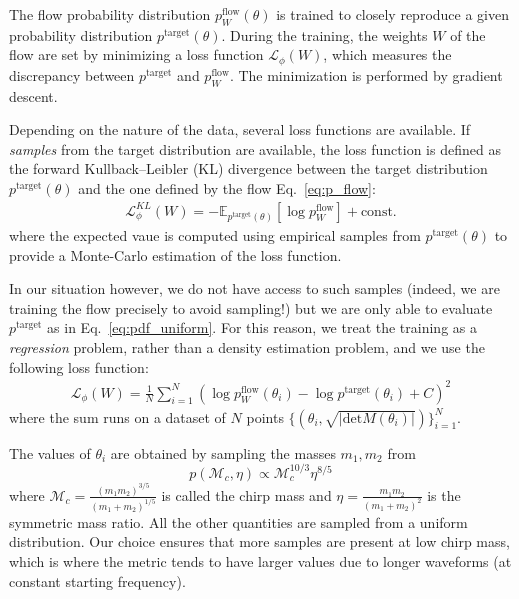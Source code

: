 \documentclass[twocolumn,showpacs,preprintnumbers,nofootinbib,prd,
superscriptaddress,10pt]{revtex4-2}
\begin{document}
The flow probability distribution $p^\text{flow}_W(\theta)$ is trained to closely reproduce a given probability distribution $p^\text{target}(\theta)$.
During the training, the weights $W$ of the flow are set by minimizing a loss function $\mathcal{L}_\phi(W)$, which measures the discrepancy between $p^\text{target}$ and $p^\text{flow}_W$. The minimization is performed by gradient descent.

Depending on the nature of the data, several loss functions are available.
If {\it samples} from the target distribution are available, the loss function is defined as the forward Kullback–Leibler (KL) divergence between the target distribution $p^\text{target}(\theta)$ and the one defined by the flow Eq.~\eqref{eq:p_flow}:
\begin{align}
	\mathcal{L}^{KL}_\phi(W) = - \mathbb{E}_{p^\text{target}(\theta)} [\log p^\text{flow}_W] + \text{const.}
\end{align}
where the expected vaue is computed using empirical samples from $p^\text{target}(\theta)$ to provide a Monte-Carlo estimation of the loss function.

In our situation however, we do not have access to such samples (indeed, we are training the flow precisely to avoid sampling!) but we are only able to evaluate $p^\text{target}$ as in Eq.~\eqref{eq:pdf_uniform}.
For this reason, we treat the training as a {\it regression} problem, rather than a density estimation problem, and we use the following loss function:
%
\begin{align}
	\mathcal{L}_\phi(W) = \frac{1}{N} \sum_{i=1}^N \left(\log p^\text{flow}_W(\theta_i) - \log p^\text{target}(\theta_i) + C \right)^2
\end{align}
%
where the sum runs on a dataset of $N$ points $\{(\theta_i, \sqrt{|\text{det}M(\theta_i)|})\}_{i=1}^N$.

The values of $\theta_i$ are obtained by sampling the masses $m_1, m_2$ from
\begin{equation}
	p(\mathcal{M}_c, \eta) \propto \mathcal{M}_c^{10/3} \eta^{8/5}
\end{equation}
where $\mathcal{M}_c = \frac{(m_1m_2)^{3/5}}{(m_1+m_2)^{1/5}}$ is called the chirp mass and $\eta = \frac{m_1m_2}{(m_1+m_2)^2}$ is the symmetric mass ratio.
All the other quantities are sampled from a uniform distribution.
Our choice ensures that more samples are present at low chirp mass, which is where the metric tends to have larger values due to longer waveforms (at constant starting frequency).
\end{document}
